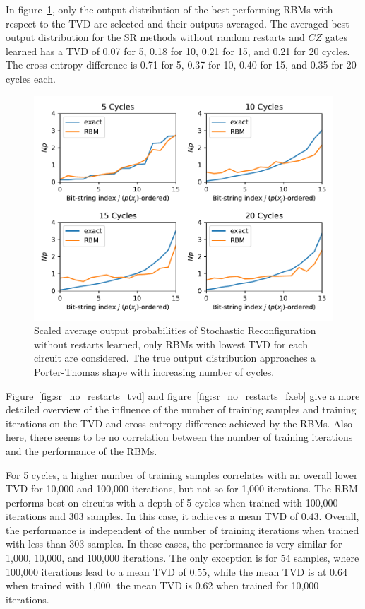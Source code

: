 In figure~\ref{fig:sr_no_restarts_bestPDF}, only the output distribution of the best performing RBMs with respect to the 
TVD are selected and their outputs averaged. The averaged best output distribution for the SR methods without 
random restarts and $CZ$ gates learned has a TVD of 0.07 for 5, 0.18 for 10, 0.21 for 15, and 0.21 for 20 
cycles. The cross entropy difference is 0.71 for 5, 0.37 for 10, 0.40 for 15, and 0.35 for 20 cycles each. 

\begin{figure}[H]
  \centering
  \includegraphics[width=\textwidth]{figures/results/SR-no-restarts-learned/avgBestPDF.pdf}
  \caption[Averaged best performing scaled output probabilities of Stochastic Reconfiguration without restarts learned]{
    Scaled average output probabilities of Stochastic Reconfiguration without restarts learned, only RBMs with lowest
    TVD for each circuit are considered. The true 
    output distribution approaches a Porter-Thomas shape with increasing number of cycles.}
  \label{fig:sr_no_restarts_bestPDF}
\end{figure}

Figure~\ref{fig:sr_no_restarts_tvd} and figure~\ref{fig:sr_no_restarts_fxeb} give a more detailed overview of the influence of the 
number of training samples and training iterations on the TVD and cross entropy difference achieved by 
the RBMs. Also here, there seems to be no correlation between the number of training
iterations and the performance of the RBMs. 

For 5 cycles, a higher number of training samples 
correlates with an overall lower TVD for 10,000 and 100,000 iterations, but not so for 1,000 iterations. The RBM performs best on 
circuits with a depth of 5 cycles when trained with 100,000 iterations and 303 samples. In this case, 
it achieves a mean TVD of $0.43$. Overall, the performance is independent of the number of 
training iterations when trained with less than 303 samples. In these cases, the performance is very 
similar for 1,000, 10,000, and 100,000 iterations. The only exception is for 54 samples, where 100,000 iterations lead to a 
mean TVD of $0.55$, while the mean TVD is at $0.64$ when trained with 1,000. the mean TVD is $0.62$ when trained for 
10,000 iterations. 

